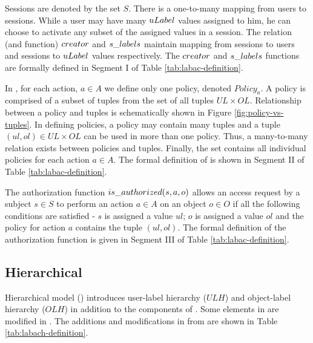 			


	
Sessions are denoted by the set $S$. There is a one-to-many mapping from users to sessions. While a user  may have many $uLabel$ values assigned to him, he can choose to activate any subset of the assigned values in a session. The relation (and function) $creator$ and $s\_labels$ maintain mapping from sessions to users and sessions to $uLabel$ values respectively.  The $creator$ and $s\_labels$ functions are formally defined in Segment I of Table \ref{tab:labac-definition}. 



In \eapABAC{}, for each action, $a \in A$ we define only one policy, denoted $Policy_a$. A policy is comprised of a subset of tuples from the set of all tuples $UL\times OL$. Relationship between a policy and tuples is schematically shown  in Figure \ref{fig:policy-vs-tuples}. In defining policies, a policy may contain many tuples and a tuple $(ul,ol) \in UL\times OL$ can be used in more than one policy. Thus, a many-to-many relation exists between policies and tuples. Finally, the set \textit{\Policy} contains all individual policies for each action $a \in A$. The formal definition of \textit{\Policy{}} is shown in Segment II of Table \ref{tab:labac-definition}.

The authorization function $is\_authorized(s, a, o)$ allows  an access request by a  subject $s \in S$ to perform an action $a \in A$ on an object $o \in O$ if all the following conditions are satisfied - $s$ is assigned a value $ul$;  $o$ is assigned a value $ol$ and the policy for action $a$ contains the tuple $(ul,ol)$. The formal definition of the authorization function is given in Segment III of Table \ref{tab:labac-definition}.


	
		

		
	
	
	\subsection{Hierarchical \eapABAC{}}
	Hierarchical \eapABAC{} model (\hlabac ) introduces user-label hierarchy ($ULH$) and object-label hierarchy ($OLH$) in addition to the components of \clabac{}. Some elements in \clabac{} are modified in \hlabac{}. The additions and modifications in \hlabac{} from \clabac{} are shown in Table \ref{tab:labach-definition}.
	

